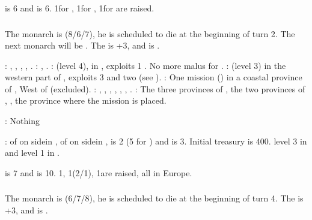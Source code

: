 \aparag {} is 6 and  is
6. 1\ARMY\faceplus for \paysmajeurPologne, 1\ARMY\faceplus for \paysLithuanie,
1\ARMY\facemoins for \paysUkraine are raised.


\subsubsection{\paysmajeurPortugal}
\aparag The monarch is  (8/6/7), he is scheduled to die at
the beginning of turn 2. The next monarch will be . The
\STAB is +3, and \POR is .

: , \provinceBeira,
\provinceTejo, \provinceAlentejo, \provinceAlgarve.
: \provinceTanger, \provinceAcores.
:  (level 4), in
, exploits 1 . No more malus for
\COLaction.
: \constructionElmina (level 3) in the western part
of \granderegionCotedor, exploits 3  and two  (see
).
: One mission () in a
coastal province of \continentAfrica, West of \granderegionCap (excluded).
: \seazoneAcores, \seazoneCanarias, \seazoneArguin,
\seazoneGambie, \seazoneGuinee, \seazoneAngola, .
: The three provinces of \granderegionCameroun, the
two provinces of \granderegionCotedor, , the province
where the mission is placed.

: Nothing

:
\bparag \MNU of  on side\facemoins in \provinceTejo, \MNU of
 on side\facemoins in , \FTI is 2 (5 for
\ROTW) and \DTI is 3.
\bparag Initial treasury is 400\ducats.
\bparag \TradeFLEET level 3 in  and level 1 in .

\aparag {} is 7 and  is
10. 1\ARMY\facemoins, 1\FLEET\facemoins (2\NWD/1\NTD), 1\LD are raised, all in
Europe.


\subsubsection{\paysmajeurRussie}
\aparag The monarch is  (6/7/8), he is scheduled to die at
the beginning of turn 4. The \STAB is +3, and \RUS is .

